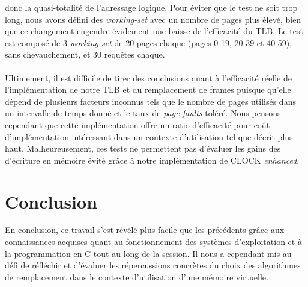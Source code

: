 \documentclass{article}
\begin{document}
donc la quasi-totalité de l’adressage logique. Pour éviter que le test ne soit trop long, nous avons défini des \emph{working-set} avec un nombre de 
pages plus élevé, bien que ce changement engendre évidement une baisse de l’efficacité du TLB. Le test est composé de 3 \emph{working-set} de 20 pages
 chaque (pages 0-19, 20-39 et 40-59), sans chevauchement, et 30 requêtes chaque. \\
\\
Ultimement, il est difficile de tirer des conclusions quant à l’efficacité réelle de l’implémentation de notre TLB et du remplacement de frames 
puisque qu’elle dépend de plusieurs facteurs inconnus tels que le nombre de pages utilisés dans un intervalle de temps donné et le taux de  \emph{page faults}
 toléré. Nous pensons cependant que cette implémentation offre un ratio d’efficacité pour coût d’implémentation intéressant dans un contexte 
d’utilisation tel que décrit plus haut. Malheureusement, ces tests ne permettent pas d’évaluer les gains des d’écriture en mémoire évité grâce à
 notre implémentation de CLOCK \emph{enhanced}.
 \\
\section{Conclusion}
En conclusion, ce travail s’est révélé plus facile que les précédents grâce aux connaissances acquises quant au fonctionnement des systèmes
 d’exploitation et à la programmation en C tout au long de la session. Il nous a cependant mis au défi de réfléchir et d’évaluer les répercussions 
 concrètes du choix des algorithmes de remplacement dans le contexte d’utilisation d’une mémoire virtuelle.
 

\setlength{\parindent}{20pt}
\end{document}
